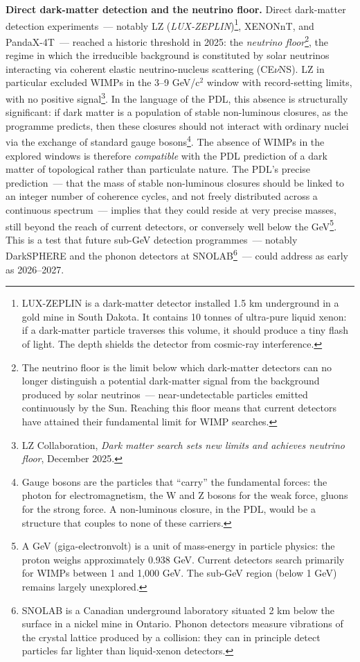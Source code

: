 \documentclass[12pt, a4paper, openright]{book}
\begin{document}
\textbf{Direct dark-matter detection and the neutrino floor.} Direct dark-matter detection experiments~--- notably LZ (\emph{LUX-ZEPLIN})\footnote{LUX-ZEPLIN is a dark-matter detector installed 1.5 km underground in a gold mine in South Dakota. It contains 10 tonnes of ultra-pure liquid xenon: if a dark-matter particle traverses this volume, it should produce a tiny flash of light. The depth shields the detector from cosmic-ray interference.}, XENONnT, and PandaX-4T~--- reached a historic threshold in 2025: the \emph{neutrino floor}\footnote{The neutrino floor is the limit below which dark-matter detectors can no longer distinguish a potential dark-matter signal from the background produced by solar neutrinos~--- near-undetectable particles emitted continuously by the Sun. Reaching this floor means that current detectors have attained their fundamental limit for WIMP searches.}, the regime in which the irreducible background is constituted by solar neutrinos interacting via coherent elastic neutrino-nucleus scattering (CE$\nu$NS). LZ in particular excluded WIMPs in the 3--9 GeV/c$^2$ window with record-setting limits, with no positive signal\footnote{LZ Collaboration, \textit{Dark matter search sets new limits and achieves neutrino floor}, December 2025.}. In the language of the PDL, this absence is structurally significant: if dark matter is a population of stable non-luminous closures, as the programme predicts, then these closures should not interact with ordinary nuclei via the exchange of standard gauge bosons\footnote{Gauge bosons are the particles that ``carry'' the fundamental forces: the photon for electromagnetism, the W and Z bosons for the weak force, gluons for the strong force. A non-luminous closure, in the PDL, would be a structure that couples to none of these carriers.}. The absence of WIMPs in the explored windows is therefore \emph{compatible} with the PDL prediction of a dark matter of topological rather than particulate nature. The PDL's precise prediction~--- that the mass of stable non-luminous closures should be linked to an integer number of coherence cycles, and not freely distributed across a continuous spectrum~--- implies that they could reside at very precise masses, still beyond the reach of current detectors, or conversely well below the GeV\footnote{A GeV (giga-electronvolt) is a unit of mass-energy in particle physics: the proton weighs approximately 0.938 GeV. Current detectors search primarily for WIMPs between 1 and 1,000 GeV. The sub-GeV region (below 1 GeV) remains largely unexplored.}. This is a test that future sub-GeV detection programmes~--- notably DarkSPHERE and the phonon detectors at SNOLAB\footnote{SNOLAB is a Canadian underground laboratory situated 2 km below the surface in a nickel mine in Ontario. Phonon detectors measure vibrations of the crystal lattice produced by a collision: they can in principle detect particles far lighter than liquid-xenon detectors.}~--- could address as early as 2026--2027.
\end{document}
